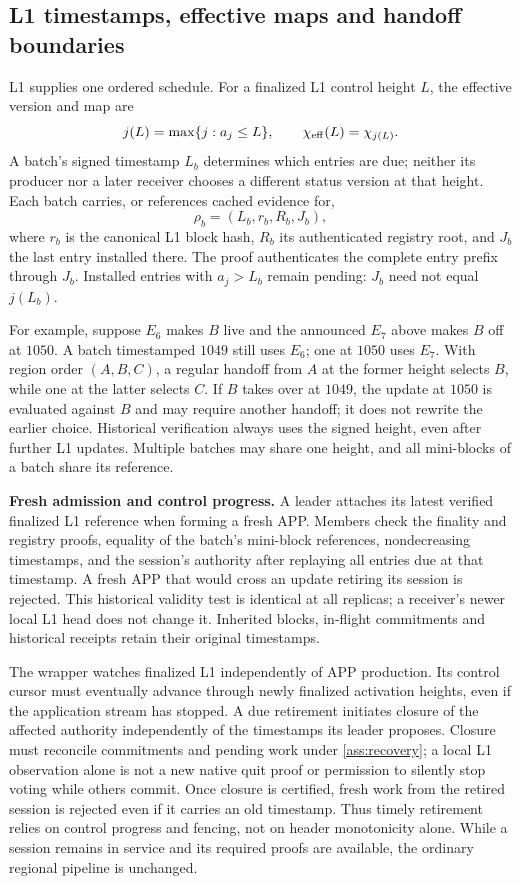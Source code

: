 \documentclass[11pt,a4paper,onecolumn]{article}
\begin{document}
\subsection{L1 timestamps, effective maps and handoff boundaries}\label{sec:snapshot}
L1 supplies one ordered schedule. For a finalized L1 control height $L$,
the effective version and map are
\[
 j(L)=\max\{j:a_j\leq L\},\qquad \chi_{\rm eff}(L)=\chi_{j(L)}.
\]
A batch's signed timestamp $L_b$ determines which entries are due; neither
its producer nor a later receiver chooses a different status version at
that height. Each batch carries, or references cached evidence for,
\[
 \rho_b=(L_b,r_b,R_b,J_b),
\]
where $r_b$ is the canonical L1 block hash, $R_b$ its authenticated registry
root, and $J_b$ the last entry installed there. The proof authenticates the
complete entry prefix through $J_b$. Installed entries with $a_j>L_b$
remain pending: $J_b$ need not equal $j(L_b)$.

For example, suppose $E_6$ makes $B$ live and the announced $E_7$ above makes
$B$ off at $1050$. A batch timestamped $1049$ still uses $E_6$; one
at $1050$ uses $E_7$. With region order $(A,B,C)$, a regular handoff from
$A$ at the former height selects $B$, while one at the latter selects $C$.
If $B$ takes over at $1049$, the update at $1050$ is evaluated against $B$
and may require another handoff; it does not rewrite the earlier choice.
Historical verification always uses the signed height, even after further
L1 updates. Multiple batches may share one height, and all mini-blocks of
a batch share its reference.

\noindent\textbf{Fresh admission and control progress.}
A leader attaches its latest verified finalized L1 reference when forming
a fresh APP. Members check the finality and registry proofs, equality of
the batch's mini-block references, nondecreasing timestamps, and the
session's authority after replaying all entries due at that timestamp.
A fresh APP that would cross an update retiring its session is rejected.
This historical validity test is identical at all replicas; a receiver's
newer local L1 head does not change it. Inherited blocks, in-flight
commitments and historical receipts retain their original timestamps.

The wrapper watches finalized L1 independently of APP production. Its
control cursor must eventually advance through newly finalized activation
heights, even if the application stream has stopped. A due retirement
initiates closure of the affected authority independently of the timestamps
its leader proposes. Closure must reconcile commitments and pending work
under \cref{ass:recovery}; a local L1 observation alone is not a new native
quit proof or permission to silently stop voting while others commit.
Once closure is certified, fresh work from the retired session is rejected
even if it carries an old timestamp. Thus timely retirement relies on
control progress and fencing, not on header monotonicity alone.
While a session remains in service and its required proofs are available,
the ordinary regional pipeline is unchanged.
\end{document}
